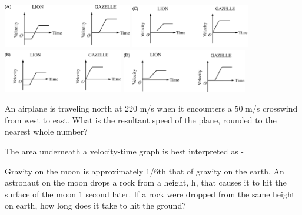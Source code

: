 \documentclass[10pt]{examdesign}
\begin{document}
\begin{multiplechoice} [title={Multiple Choice},
	rearrange=yes]
\begin{question}
	\includegraphics[height=0.75in]{lga.png} \hspace{1in} \includegraphics[height=0.75in]{lgc.png} \\	
	\includegraphics[height=0.75in]{lgb.png} \hspace{1in} \includegraphics[height=0.75in]{lgd.png}

\end{question}

\begin{question}
An airplane is traveling north at 220 m/s when it encounters a 50 m/s crosswind from west to east.  What is the resultant speed of the plane, rounded to the nearest whole number? 
	\end{question}


\begin{question}
	The area underneath a velocity-time graph is best interpreted as - 
\end{question}

\begin{question}
Gravity on the moon is approximately 1/6th that of gravity on the earth.  An astronaut on the moon drops  a rock from a height, h, that causes it to hit the surface of the moon 1 second later. If a rock were dropped from the same height on earth, how long does it take to hit the ground?
	\end{question}


\end{multiplechoice}
\end{document}

